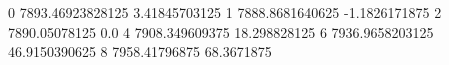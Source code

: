 0 7893.46923828125 3.41845703125
1 7888.8681640625 -1.1826171875
2 7890.05078125 0.0
4 7908.349609375 18.298828125
6 7936.9658203125 46.9150390625
8 7958.41796875 68.3671875
